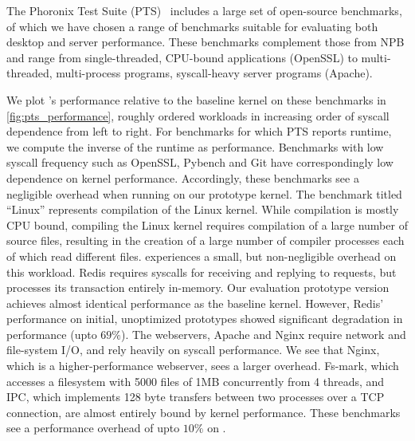 \documentclass[letterpaper,twocolumn,10pt, anonymous]{article}
\begin{document}
The Phoronix Test Suite (PTS)~\cite{pts} includes a large set of 
open-source benchmarks, of which we have chosen a range of benchmarks 
suitable for evaluating both desktop and server performance.
These benchmarks complement those from NPB and range from single-threaded, 
CPU-bound applications (OpenSSL) to multi-threaded, multi-process 
programs, syscall-heavy server programs (Apache).

We plot \tiktok's performance relative to the baseline kernel on
these benchmarks in \autoref{fig:pts_performance}, roughly ordered 
workloads in increasing order of syscall dependence from left to right.
For benchmarks for which PTS reports runtime, we compute the inverse 
of the runtime as performance.
Benchmarks with low syscall frequency such as OpenSSL, 
Pybench and Git have correspondingly low dependence on kernel performance.
Accordingly, these benchmarks see a negligible overhead when running 
on our prototype kernel.
The benchmark titled ``Linux'' represents compilation of the Linux kernel.
While compilation is mostly CPU bound, compiling the Linux kernel requires 
compilation of a large number of source files, resulting in the creation 
of a large number of compiler processes each of which read different files. 
\tiktok experiences a small, but non-negligible overhead on this workload.
Redis requires syscalls for receiving and replying to requests, but 
processes its transaction entirely in-memory. 
Our evaluation prototype version achieves almost identical performance
as the baseline kernel.
However, Redis' performance on initial, unoptimized prototypes showed
significant degradation in performance (upto $69\%$).
The webservers, Apache and Nginx require network and file-system I/O, 
and rely heavily on syscall performance. 
We see that Nginx, which is a higher-performance webserver, sees a larger
overhead.
Fs-mark, which accesses a filesystem with 5000 files of 1MB concurrently
from 4 threads, and IPC, which implements 128 byte transfers between 
two processes over a TCP connection, are almost entirely bound by kernel 
performance. 
These benchmarks see a performance overhead of upto $10\%$ on \tiktok.
\end{document}
